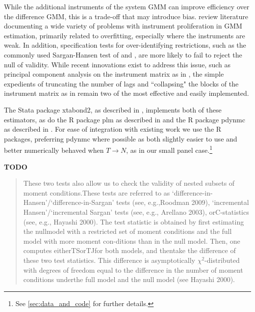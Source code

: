 \documentclass[12pt,a4paper]{article}
\newcommand{\pkg}[1]{{\fontseries{b}\selectfont #1}}
\begin{document}
While the additional instruments of the system GMM can improve efficiency over the difference GMM, this is a trade-off that may introduce bias.
\cite{bontempiImplementingStrategyReduce2015} review literature documenting a wide variety of problems with instrument proliferation in GMM estimation, primarily related to overfitting, especially where the instruments are weak.
In addition, specification tests for over-identifying restrictions, such as the commonly used Sargan-Hansen test of \cite{sarganEstimationEconomicRelationships1958} and \cite{hansenLargeSampleProperties1982}, are more likely to fail to reject the null of validity.
While recent innovations exist to address this issue, such as principal component analysis on the instrument matrix as in \cite{bontempiImplementingStrategyReduce2015}, the simple expedients of truncating the number of lags and ``collapsing" the blocks of the instrument matrix as in \cite{roodmanNoteThemeToo2009} remain two of the most effective and easily implemented.

The Stata package \pkg{xtabond2}, as described in \cite{roodmanHowXtabond2Introduction2009}, implements both of these estimators, as do the R package \pkg{plm} as described in \cite{croissantPanelDataEconometrics2008} and the R package \pkg{pdynmc} as described in \cite{fritschPdynmcPackageEstimating2019}.
For ease of integration with existing work we use the R packages, preferring \pkg{pdynmc} where possible as both slightly easier to use and better numerically behaved when $T \rightarrow N$, as in our small panel case.\footnote{
See \cref{sec:data_and_code} for further details.
}




\vspace{1cm}
\noindent\textbf{TODO}
\begin{quote}
\cite{roodmanNoteThemeToo2009}
These two tests also allow us to check the validity of nested subsets of moment conditions.These  tests  are  referred  to  as  `difference-in-Hansen'/`difference-in-Sargan'  tests  (see,  e.g.,Roodman 2009), ‘incremental Hansen’/‘incremental Sargan’ tests (see, e.g., Arellano 2003), orC-statistics (see, e.g., Hayashi 2000).  
The test statistic is obtained by first estimating the nullmodel with a restricted set of moment conditions and the full model with more moment con-ditions than in the null model.  Then, one computes eitherTSorTJfor both models, and thentake the difference of these two test statistics.  This difference is asymptotically $\chi^2$-distributed with degrees of freedom equal to the difference in the number of moment conditions underthe full model and the null model (see Hayashi 2000).
\end{quote}
\end{document}
